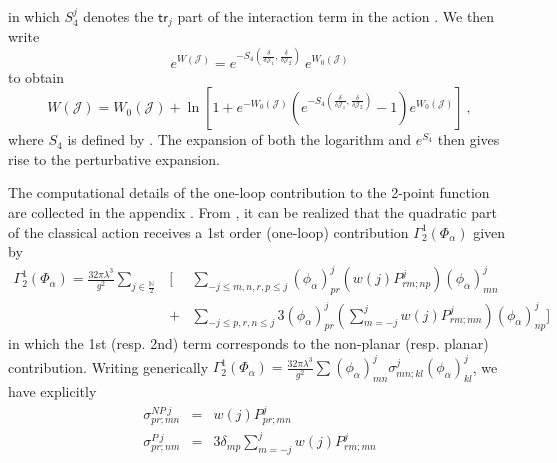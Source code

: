 \documentclass[10pt]{book}
\newcommand{\tr}{\mathsf{tr}}
\theoremstyle{break}
\begin{document}
in which $S^j_4$ denotes the $\tr_j$ part of the interaction term in the action %
. We then write 
\begin{equation*}
e^{W(\mathcal{J})} = e^{-S_4(\frac{\delta}{\delta\mathcal{J}_1},\frac{\delta}{\delta\mathcal{J}_2})}\ e^{W_0(\mathcal{J})}
\end{equation*}
%
to obtain%
%
\begin{equation*}
W(\mathcal{J}) = W_0(\mathcal{J}) + \ln\left[ 1 + e^{-W_0(\mathcal{J})}
\left( e^{-S_4(\frac{\delta}{\delta\mathcal{J}_1},\frac{\delta}{\delta\mathcal{J}_2})} - 1 \right) e^{W_0(\mathcal{J})}\right] \ , %
\end{equation*}
%
where $S_4$ is defined by %
. The expansion of both the logarithm and $e^{S_4}$ then gives rise to the perturbative expansion. \par 







The computational details of the one-loop contribution to the 2-point function are collected in the appendix %
. From %
, it can be realized that the quadratic part of the classical action receives a 1st order (one-loop) contribution $\Gamma^1_2(\Phi_\alpha)$ given by
\begin{eqnarray*}
\Gamma^1_2(\Phi_\alpha)=\frac{32\pi\lambda^3}{g^2}\sum_{j\in\frac{\mathbb{N}}{2}}&\Bigg[&\sum_{-j\le m,n,r,p\le j}(\phi_\alpha)^j_{pr}\left(w(j)P^j_{rm;np}\right)(\phi_\alpha)^j_{mn}\nonumber\\
&+&\sum_{-j\le p,r,n\le j}3(\phi_\alpha)^j_{pr}\left(\sum_{m=-j}^jw(j)P^j_{rm;mn}\right)(\phi_\alpha)^j_{np} \Bigg]%
\end{eqnarray*}
in which the 1st (resp. 2nd) term corresponds to the non-planar (resp. planar) contribution. Writing generically $\Gamma^1_2(\Phi_\alpha)=\frac{32\pi\lambda^3}{g^2}\sum(\phi_\alpha)^j_{mn}\sigma^j_{mn;kl}(\phi_\alpha)^j_{kl}$, we have explicitly
\begin{eqnarray*}
\sigma^{NP\ j}_{pr;mn}&=& w(j)P^j_{pr;mn}%
\\
\sigma^{P\ j}_{pr;nm}&=&3\delta_{mp}\sum_{m=-j}^jw(j)P^j_{rm;mn}%
\end{eqnarray*}
\end{document}

